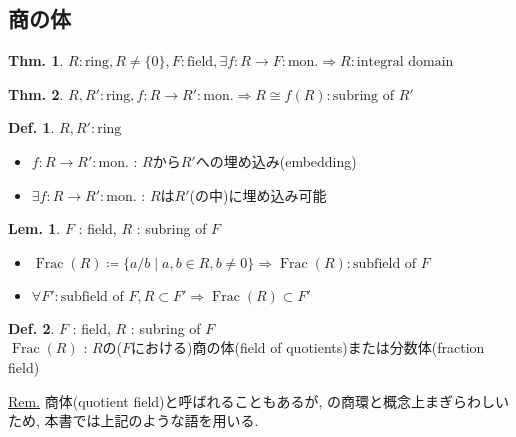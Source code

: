 \documentclass[uplatex,dvipdfmx,9pt]{beamer}
\newcommand{\Frac}[1]{\operatorname{Frac}(#1)}
\newcommand{\mon}{\text{mon.}} %
\newcommand{\sscount}{\textsection \thesubsection}
\newcounter{textLemCount}
\newcounter{textExmCount}
\theoremstyle{definition} %
\newtheorem{defn}{Def.}[subsection] %
\newtheorem{thm}{Thm.}[subsection] %
\newtheorem{lemText}[textLemCount]{Lem.} %
\theoremstyle{example}
\begin{document}
    \subsection{\sscount 商の体}
    \setcounter{textExmCount}{0}

    \begin{frame}

      \begin{thm}
        $R : \text{ring}, R \neq \{0\}, F : \text{field}, \exists f\colon R \to F : \mon \Rightarrow R : \text{integral domain}$
      \end{thm}

      \begin{thm}
        $R, R' : \text{ring}, f\colon R \to R' : \mon \Rightarrow R \cong f(R) : \text{subring of $R'$}$
      \end{thm}

      \begin{defn}
        $R, R' : \text{ring}$
        \begin{itemize}
          \item $f\colon R \to R' : \mon$ : $R$から$R'$への\alert{埋め込み(embedding)}
          \item $\exists f\colon R \to R' : \mon$ : $R$は$R'$(の中)に\alert{埋め込み可能}
        \end{itemize}
      \end{defn}
      
    \end{frame}

    \begin{frame}

      \begin{lemText}
        $F$ : field, $R$ : subring of $F$
        \begin{itemize}
          \item $\Frac{R} \coloneqq \{a/b \mid a,b \in R, b \neq 0\} \Rightarrow \Frac{R} : \text{subfield of $F$}$ 
          \item $\forall F' : \text{subfield of $F$}, R \subset F' \Rightarrow \Frac{R} \subset F'$
        \end{itemize}
      \end{lemText}

      \begin{defn}
        $F$ : field, $R$ : subring of $F$ \\
        $\Frac{R}$ : $R$の($F$における)\alert{商の体(field of quotients)}または\alert{分数体(fraction field)}
      \end{defn}
      \underline{Rem.} 商体(quotient field)と呼ばれることもあるが,  の商環と概念上まぎらわしいため, 本書では上記のような語を用いる.
      
    \end{frame}
\end{document}
